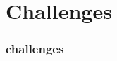 \section{Challenges}
\begin{comment}
* Challenges of doing open community stuff with students
** Some problems remaining to solve (for instance, IRC's interface sucks, community members don't always understand the "shoot self in foot" redirection need, hard to find projects, etc)
\end{comment}

\begin{frame} 
\frametitle{challenges}
\end{frame} 
